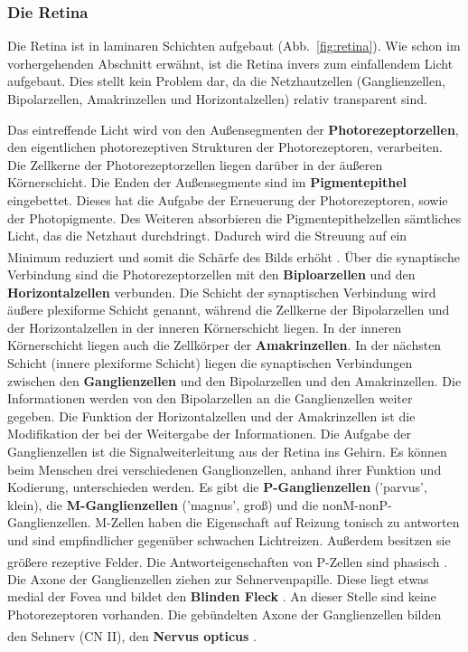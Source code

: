 \subsubsection*{Die Retina}


Die Retina ist in laminaren Schichten aufgebaut (Abb.~\ref{fig:retina}).
Wie schon im vorhergehenden Abschnitt erwähnt, ist die Retina invers zum einfallendem Licht aufgebaut. Dies stellt kein Problem dar, da die Netzhautzellen (Ganglienzellen, Bipolarzellen, Amakrinzellen und Horizontalzellen) relativ transparent sind.

Das eintreffende Licht wird von den Außensegmenten der \textbf{Photorezeptorzellen}, den eigentlichen photorezeptiven Strukturen der Photorezeptoren, verarbeiten. Die Zellkerne der Photorezeptorzellen  liegen darüber in der äußeren Körnerschicht. Die Enden der Außensegmente sind im \textbf{Pigmentepithel}  eingebettet. Dieses hat die Aufgabe der Erneuerung der Photorezeptoren, sowie der Photopigmente. Des Weiteren absorbieren die Pigmentepithelzellen sämtliches Licht, das die Netzhaut durchdringt. Dadurch wird die Streuung auf ein Minimum reduziert und somit die Schärfe des Bilds erhöht \textsuperscript{\cite[Kap.~10]{neurowissenschaften_baer}}. Über die synaptische Verbindung sind die Photorezeptorzellen mit den \textbf{Biploarzellen}  und den \textbf{Horizontalzellen}  verbunden. Die Schicht der synaptischen Verbindung wird äußere plexiforme Schicht genannt, während die Zellkerne der Bipolarzellen und der Horizontalzellen in der inneren Körnerschicht liegen. In der inneren Körnerschicht liegen auch die Zellkörper der \textbf{Amakrinzellen}.  In der nächsten Schicht (innere plexiforme Schicht) liegen die synaptischen Verbindungen zwischen den \textbf{Ganglienzellen}  und den Bipolarzellen und den Amakrinzellen. Die Informationen werden von den Bipolarzellen an die Ganglienzellen weiter gegeben. Die Funktion der Horizontalzellen und der Amakrinzellen ist die Modifikation der bei der Weitergabe der Informationen.
Die Aufgabe der Ganglienzellen ist die Signalweiterleitung aus der Retina ins Gehirn. Es können beim Menschen drei verschiedenen Ganglionzellen, anhand ihrer Funktion und Kodierung, unterschieden werden. Es gibt die \textbf{P-Ganglienzellen}  ('parvus', klein), die \textbf{M-Ganglienzellen}  ('magnus', groß) und die nonM-nonP-Ganglienzellen. 
M-Zellen haben die Eigenschaft auf Reizung tonisch zu antworten und sind empfindlicher gegenüber schwachen Lichtreizen. Außerdem besitzen sie größere rezeptive Felder. Die Antworteigenschaften von P-Zellen sind phasisch \textsuperscript{\cite[Kap.~10]{neurowissenschaften_baer}}. 
Die Axone der Ganglienzellen ziehen zur Sehnervenpapille. Diese liegt etwas medial der Fovea und bildet den \textbf{Blinden Fleck} . An dieser Stelle sind keine Photorezeptoren vorhanden. Die gebündelten Axone der Ganglienzellen bilden den Sehnerv (CN II), den \textbf{Nervus opticus} \textsuperscript{\cite[Kap.~15]{crossman2014neuroanatomy}}.  

